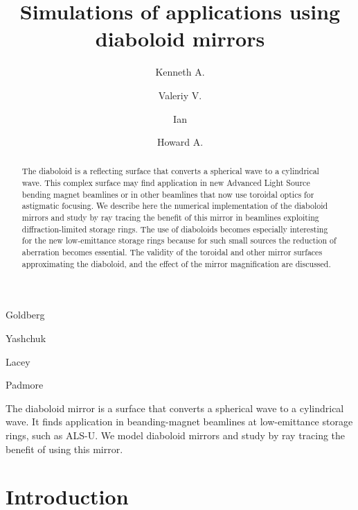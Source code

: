 \documentclass[preprint]{iucr}       %
\newcommand{\inred}[1]{{\color{red}#1}}
\begin{document}




\title{Simulations of applications using diaboloid mirrors}

\author[a]{Kenneth A.}{Goldberg}
\author[a]{Valeriy V.}{Yashchuk}
\author[a]{Ian}{Lacey}
\author[a]{Howard A.}{Padmore}




\begin{synopsis}
The diaboloid mirror is a surface that converts a spherical wave to a cylindrical wave. It finds application in beanding-magnet beamlines at low-emittance storage rings, such as ALS-U. We model diaboloid mirrors and study by ray tracing the benefit of using this mirror.
\end{synopsis}

\begin{abstract}
The diaboloid is a reflecting surface that converts a spherical wave to a cylindrical wave. This complex surface may find application in new Advanced Light Source bending magnet beamlines or in other beamlines that now use toroidal optics for astigmatic focusing. We describe here the numerical implementation of the diaboloid mirrors and study by ray tracing the benefit of this mirror in beamlines exploiting diffraction-limited storage rings.
\inred{The use of diaboloids becomes especially interesting for the new low-emittance storage rings because for such small sources the reduction of aberration becomes essential. The validity of the toroidal and other mirror surfaces approximating the diaboloid, and the effect of the mirror magnification are discussed.}
\end{abstract}

\section{Introduction}
\end{document}

